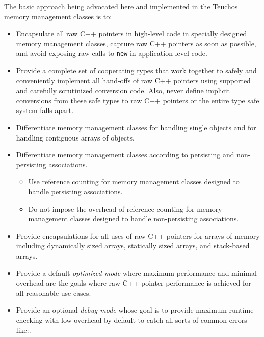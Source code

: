 \documentclass[pdf,ps2pdf,11pt]{SANDreport}
\begin{document}
The basic approach being advocated here and implemented in the Teuchos
memory management classes is to:

\begin{itemize}

{}\item Encapsulate all raw C++ pointers in high-level code in
specially designed memory management classes, capture raw C++ pointers
as soon as possible, and avoid exposing raw calls to {}\texttt{new} in
application-level code.

{}\item Provide a complete set of cooperating types that work together
to safely and conveniently implement all hand-offs of raw C++
pointers using supported and carefully scrutinized conversion code.
Also, never define implicit conversions from these safe types to raw
C++ pointers or the entire type safe system falls apart.

{}\item Differentiate memory management classes for handling single
objects and for handling contiguous arrays of objects.

{}\item Differentiate memory management classes according to
persisting and non-persisting associations.

  \begin{itemize}

  {}\item Use reference counting for memory management classes
  designed to handle persisting associations.

  {}\item Do not impose the overhead of reference counting for memory
  management classes designed to handle non-persisting associations.

  \end{itemize}

{}\item Provide encapsulations for all uses of raw C++ pointers for
arrays of memory including dynamically sized arrays, statically sized
arrays, and stack-based arrays.

{}\item Provide a default {}\textit{optimized mode} where maximum
performance and minimal overhead are the goals where raw C++ pointer
performance is achieved for all reasonable use cases.

{}\item Provide an optional {}\textit{debug mode} whose goal is to
provide maximum runtime checking with low overhead by default to catch
all sorts of common errors like:.


\end{itemize}
\end{document}
